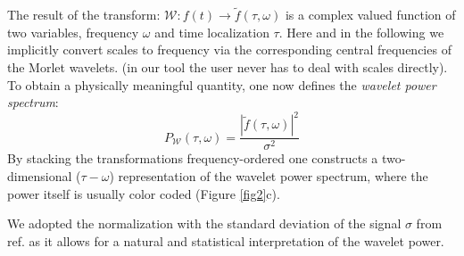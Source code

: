 The result of the transform: $\mathcal{W}: f(t) \rightarrow \widetilde{f}(\tau,\omega)$ is a complex valued function of two variables, frequency $\omega$ and time localization $\tau$. Here and in the following we implicitly convert scales to frequency via the corresponding central frequencies of the Morlet wavelets. (in our tool the user never has to deal with scales directly). To obtain a physically meaningful quantity, one now defines the \textit{wavelet power spectrum}:
\begin{equation}
P_\mathcal{W}(\tau, \omega) = \frac{|\widetilde{f}(\tau, \omega)|^2}{\sigma^2}
\end{equation}
By stacking the transformations frequency-ordered one constructs a two-dimensional ($\tau-\omega$) representation of the wavelet power spectrum, where the power itself is usually color coded (Figure \ref{fig2}c).

We adopted the normalization with the standard deviation of the signal $\sigma$ from ref. \cite{Torrence1998} as it allows for a natural and statistical interpretation of the wavelet power. 
